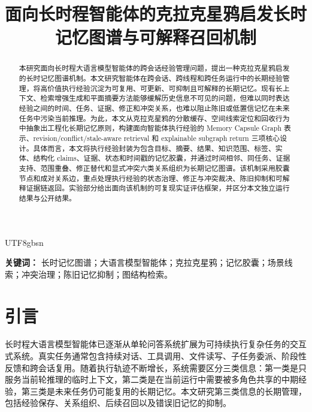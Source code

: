 \documentclass[a4paper,fleqn]{cas-sc}
\begin{document}
\begin{CJK*}{UTF8}{gbsn}
\sloppy
\let\WriteBookmarks\relax
\def\floatpagepagefraction{1}
\def\textpagefraction{.001}
\ExplSyntaxOn
\RenewDocumentCommand \printorcid { } { }
\ExplSyntaxOff

\title{面向长时程智能体的克拉克星鸦启发长时记忆图谱与可解释召回机制}
\date{}

\maketitle

\begin{abstract}
本研究面向长时程大语言模型智能体的跨会话经验管理问题，提出一种克拉克星鸦启发的长时记忆图谱机制。本文研究智能体在跨会话、跨线程和跨任务运行中的长期经验管理，将高价值执行经验沉淀为可复用、可更新、可抑制且可解释的长期记忆。现有长上下文、检索增强生成和平面摘要方法能够缓解历史信息不可见的问题，但难以同时表达经验之间的时间、任务、证据、修正和冲突关系，也难以阻止陈旧或低置信记忆在未来任务中污染当前推理。为此，本文从克拉克星鸦的分散缓存、空间线索定位和回收行为中抽象出工程化长期记忆原则，构建面向智能体执行经验的 Memory Capsule Graph 表示、revision/conflict/stale-aware retrieval 和 explainable subgraph return 三项核心设计。具体而言，本文将执行经验封装为包含目标、摘要、结果、知识范围、标签、实体、结构化 claims、证据、状态和时间戳的记忆胶囊，并通过时间相邻、同任务、证据支持、范围重叠、修正替代和显式冲突六类关系组织为长期记忆图谱。该机制采用胶囊节点和成对关系边，重点处理执行经验的状态治理、修正与冲突裁决、陈旧抑制和可解释证据链返回。实验部分给出面向该机制的可复现实证评估框架，并区分本文独立运行结果与公开结果。
\end{abstract}

\noindent\textbf{关键词：} 长时记忆图谱；大语言模型智能体；克拉克星鸦；记忆胶囊；场景线索；冲突治理；陈旧记忆抑制；图结构检索。

\section{引言}

长时程大语言模型智能体已逐渐从单轮问答系统扩展为可持续执行复杂任务的交互式系统。真实任务通常包含持续对话、工具调用、文件读写、子任务委派、阶段性反馈和跨会话复用。随着执行轨迹不断增长，系统需要区分三类信息：第一类是只服务当前轮推理的临时上下文，第二类是在当前运行中需要被多角色共享的中期经验，第三类是未来任务仍可能复用的长期记忆。本文研究第三类信息的长期管理，包括经验保存、关系组织、后续召回以及错误旧记忆的抑制。


\end{CJK*}
\end{document}
